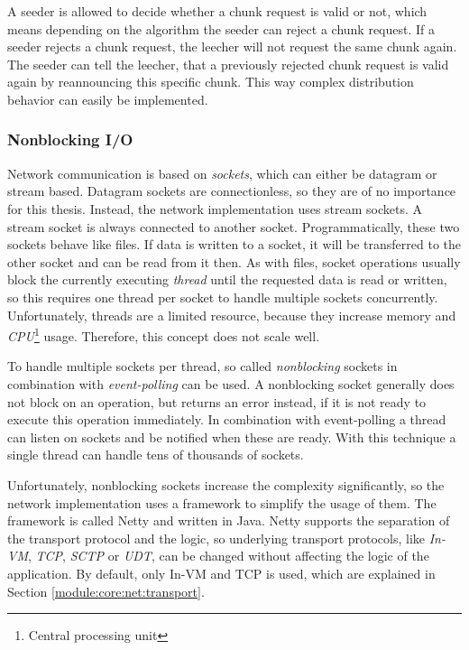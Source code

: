 A seeder is allowed to decide whether a chunk request is valid or not, which means depending on the algorithm the seeder can reject a chunk request. If a seeder rejects a chunk request, the leecher will not request the same chunk again. The seeder can tell the leecher, that a previously rejected chunk request is valid again by reannouncing this specific chunk. This way complex distribution behavior can easily be implemented.


\subsubsection{Nonblocking I/O}
Network communication is based on \emph{sockets}, which can either be datagram or stream based. Datagram sockets are connectionless, so they are of no importance for this thesis. Instead, the network implementation uses stream sockets. A stream socket is always connected to another socket. Programmatically, these two sockets behave like files. If data is written to a socket, it will be transferred to the other socket and can be read from it then. As with files, socket operations usually block the currently executing \emph{thread} until the requested data is read or written, so this requires one thread per socket to handle multiple sockets concurrently. Unfortunately, threads are a limited resource, because they increase memory and \emph{CPU}\footnote{Central processing unit} usage. Therefore, this concept does not scale well.

To handle multiple sockets per thread, so called \emph{nonblocking} sockets in combination with \emph{event-polling} can be used. A nonblocking socket generally does not block on an operation, but returns an error instead, if it is not ready to execute this operation immediately. In combination with event-polling a thread can listen on sockets and be notified when these are ready. With this technique a single thread can handle tens of thousands of sockets.

Unfortunately, nonblocking sockets increase the complexity significantly, so the network implementation uses a framework to simplify the usage of them. The framework is called Netty \cite{Misc:Netty} and written in Java. Netty supports the separation of the transport protocol and the logic, so underlying transport protocols, like \emph{In-VM}, \emph{TCP}, \emph{SCTP} or \emph{UDT}, can be changed without affecting the logic of the application. By default, only In-VM and TCP is used, which are explained in Section \ref{module:core:net:transport}.

